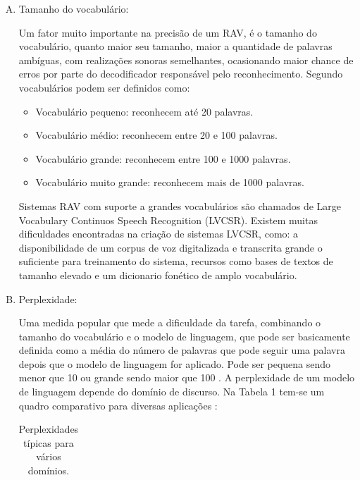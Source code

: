 \begin{enumerate}[A)]
\item Tamanho do vocabulário:

Um fator muito importante na precisão de um RAV, é o tamanho do vocabulário, quanto maior seu tamanho, maior a quantidade de palavras ambíguas, com realizações sonoras semelhantes, ocasionando maior chance de erros por parte do decodificador responsável pelo reconhecimento. Segundo \cite{RavIsolAnderson} vocabulários podem ser definidos como:

\begin{itemize}
\item Vocabulário pequeno: reconhecem até 20 palavras. 
\item Vocabulário médio: reconhecem entre 20 e 100 palavras. 
\item Vocabulário grande: reconhecem entre 100 e 1000 palavras. 
\item Vocabulário muito grande: reconhecem mais de 1000 palavras. 
\end{itemize}

Sistemas RAV com suporte a grandes vocabulários são chamados de Large Vocabulary Continuos Speech Recognition (LVCSR). Existem muitas dificuldades encontradas na criação de sistemas LVCSR, como: a disponibilidade de um corpus de voz digitalizada e transcrita grande o suficiente para treinamento do sistema, recursos como bases de textos de
tamanho elevado e um dicionario fonético de amplo vocabulário.

\item Perplexidade: 

Uma medida popular que mede a dificuldade da tarefa, combinando o tamanho do vocabulário e o modelo de linguagem, que pode ser basicamente definida como a média do número de palavras que pode seguir uma palavra depois que o modelo de linguagem for aplicado. Pode ser pequena sendo menor que 10 ou grande sendo maior que 100 \cite{RavHmmCarlos}. A perplexidade de um modelo de linguagem depende do domínio de discurso. Na Tabela 1 tem-se um quadro comparativo para diversas aplicações \cite{SurveyCole} :

\begin{table}[H] %

\centering

\caption{Perplexidades típicas para vários domínios.} %

\begin{tabular}{cc} %


\end{tabular}
\end{table}
\end{enumerate}
